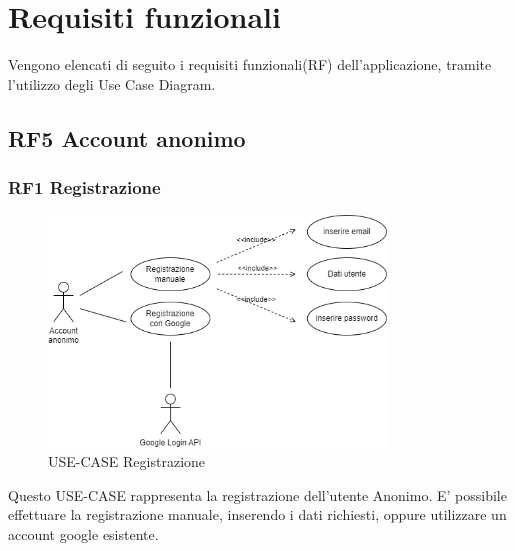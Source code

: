 \documentclass[a4paper,12pt]{article}
\begin{document}
\newpage

\section{Requisiti funzionali}

Vengono elencati di seguito i requisiti funzionali(RF) dell'applicazione, tramite l'utilizzo degli Use Case Diagram.

\subsection*{RF5 Account anonimo}

\subsubsection*{RF1 Registrazione}
\begin{figure}[H]
   \centering
    \includegraphics[width=0.8\textwidth]{img-D2/registrazione_anonimo.png}
    \caption{USE-CASE Registrazione}
\end{figure}

Questo USE-CASE rappresenta la registrazione dell'utente Anonimo.
E' possibile effettuare la registrazione manuale, inserendo i dati richiesti, oppure utilizzare un account google esistente.
\end{document}
